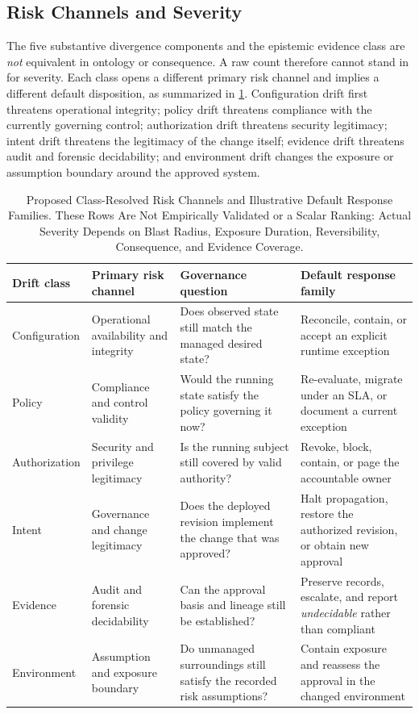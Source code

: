 \subsection{Risk Channels and Severity}
\label{sec:severity}

The five substantive divergence components and the epistemic evidence class
are \emph{not} equivalent in ontology or consequence. A raw count
therefore cannot stand in for severity. Each class opens a different primary
risk channel and implies a different default disposition, as summarized in
\cref{tab:severity}. Configuration drift first threatens operational
integrity; policy drift threatens compliance with the currently governing
control; authorization drift threatens security legitimacy; intent drift
threatens the legitimacy of the change itself; evidence drift threatens audit
and forensic decidability; and environment drift changes the exposure or
assumption boundary around the approved system.

\begin{table}[t]
\centering
\caption{Proposed Class-Resolved Risk Channels and Illustrative Default
Response Families. These Rows Are Not Empirically Validated or a Scalar
Ranking: Actual Severity Depends on Blast Radius, Exposure Duration,
Reversibility, Consequence, and Evidence Coverage.}
\label{tab:severity}
\footnotesize
\begin{tabular}{@{}p{}p{}p{}p{}@{}}
\toprule
Drift class & Primary risk channel & Governance question & Default response family \\
\midrule
Configuration & Operational availability and integrity & Does observed state still match the managed desired state? & Reconcile, contain, or accept an explicit runtime exception \\
Policy & Compliance and control validity & Would the running state satisfy the policy governing it now? & Re-evaluate, migrate under an SLA, or document a current exception \\
Authorization & Security and privilege legitimacy & Is the running subject still covered by valid authority? & Revoke, block, contain, or page the accountable owner \\
Intent & Governance and change legitimacy & Does the deployed revision implement the change that was approved? & Halt propagation, restore the authorized revision, or obtain new approval \\
Evidence & Audit and forensic decidability & Can the approval basis and lineage still be established? & Preserve records, escalate, and report \emph{undecidable} rather than compliant \\
Environment & Assumption and exposure boundary & Do unmanaged surroundings still satisfy the recorded risk assumptions? & Contain exposure and reassess the approval in the changed environment \\
\bottomrule
\end{tabular}
\end{table}

